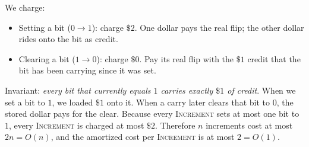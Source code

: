 We charge:
\begin{itemize}
  \item Setting a bit ($0 \to 1$): charge $\$2$. One dollar pays the real flip;
        the other dollar rides onto the bit as credit.
  \item Clearing a bit ($1 \to 0$): charge $\$0$. Pay its real flip with the $\$1$
        credit that the bit has been carrying since it was set.
\end{itemize}

Invariant: \emph{every bit that currently equals $1$ carries exactly $\$1$ of
credit}. When we set a bit to $1$, we loaded $\$1$ onto it. When a carry later
clears that bit to $0$, the stored dollar pays for the clear. Because every
\textsc{Increment} sets at most one bit to $1$, every \textsc{Increment} is charged
at most $\$2$. Therefore $n$ increments cost at most $2n = O(n)$, and the amortized
cost per \textsc{Increment} is at most $2 = O(1)$.

